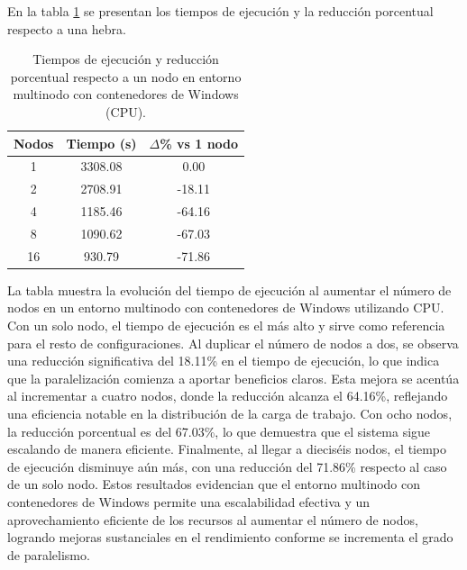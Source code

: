En la tabla \ref{tab:multi-node_windows_docker} se presentan los tiempos de ejecución y la reducción porcentual respecto a una hebra.

\begin{table}[ht]
    \centering
    \begin{tabular}{|c|c|c|}
        \hline
        \textbf{Nodos} & \textbf{Tiempo (s)} & \textbf{$\Delta$\% vs 1 nodo} \\
        \hline
        1              & 3308.08             & 0.00                          \\
        2              & 2708.91             & -18.11                        \\
        4              & 1185.46             & -64.16                        \\
        8              & 1090.62             & -67.03                        \\
        16             & 930.79              & -71.86                        \\
        \hline
    \end{tabular}
    \caption{Tiempos de ejecución y reducción porcentual respecto a un nodo en entorno multinodo con contenedores de Windows (CPU).}
    \label{tab:multi-node_windows_docker}
\end{table}

La tabla muestra la evolución del tiempo de ejecución al aumentar el número de nodos en un entorno multinodo con contenedores de Windows utilizando CPU. Con un solo nodo, el tiempo de ejecución es el más alto y sirve como referencia para el resto de configuraciones. Al duplicar el número de nodos a dos, se observa una reducción significativa del 18.11\% en el tiempo de ejecución, lo que indica que la paralelización comienza a aportar beneficios claros. Esta mejora se acentúa al incrementar a cuatro nodos, donde la reducción alcanza el 64.16\%, reflejando una eficiencia notable en la distribución de la carga de trabajo. Con ocho nodos, la reducción porcentual es del 67.03\%, lo que demuestra que el sistema sigue escalando de manera eficiente. Finalmente, al llegar a dieciséis nodos, el tiempo de ejecución disminuye aún más, con una reducción del 71.86\% respecto al caso de un solo nodo. Estos resultados evidencian que el entorno multinodo con contenedores de Windows permite una escalabilidad efectiva y un aprovechamiento eficiente de los recursos al aumentar el número de nodos, logrando mejoras sustanciales en el rendimiento conforme se incrementa el grado de paralelismo.

